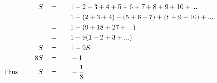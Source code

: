 \begin{alignat*}{5}
&\,&S\quad&=\quad&&1+2+3+4+5+6+7+8+9+10+...\\
&\,&\,&=&&1+(2+3+4)+(5+6+7)+(8+9+10)+...\\
&\,&\,&=&&1+(9+18+27+...)\\
&\,&\,&=&&1+9(1+2+3+...)\\
&\,&S\quad&=&&1+9S\\
&\,&8S\quad&=&&-1\\
&\small\text{Thus}&\qquad S\quad&=&&-\frac{1}{8}
\end{alignat*}
